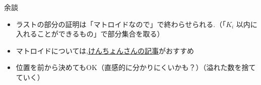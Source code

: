\documentclass[dvipdfmx,12pt]{beamer}%
\begin{document}
\begin{frame}{余談}
\begin{itemize}
	\item ラストの部分の証明は「マトロイドなので」で終わらせられる.（「$ K_i $ 以内に入れることができるもの」で部分集合を取る）
	\item マトロイドについては,\href{https://drken1215.hatenablog.com/entry/20121212/1355280288}{けんちょんさんの記事}がおすすめ
	\item 位置を前から決めてもOK（直感的に分かりにくいかも？）（溢れた数を捨てていく）
\end{itemize}

\end{frame}

%
%
\end{document}

